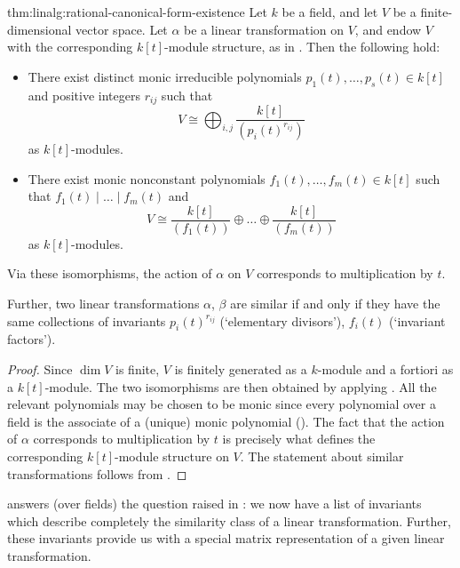 \begin{thm}{}{thm:linalg:rational-canonical-form-existence}
  Let $k$ be a field, and let $V$ be a finite-dimensional vector
  space.  Let $\alpha$ be a linear transformation on $V$, and endow
  $V$ with the corresponding $k[t]$-module structure, as in
  .  Then the following hold:
  \begin{itemize}
  \item There exist distinct monic irreducible polynomials
    $p_1(t), \dots, p_s(t) \in k[t]$ and positive integers $r_{ij}$
    such that
    \[
      V \cong \bigoplus_{i,j} \frac{k[t]}{(p_i(t)^{r_{ij}})}
    \]
    as $k[t]$-modules.
  \item There exist monic nonconstant polynomials
    $f_1(t), \dots, f_m(t) \in k[t]$ such that
    $f_1(t) \mid \dots \mid f_m(t)$ and
    \[
      V \cong \frac{k[t]}{(f_1(t))} \oplus \dots \oplus
      \frac{k[t]}{(f_m(t))}
    \]
    as $k[t]$-modules.
  \end{itemize}
  Via these isomorphisms, the action of $\alpha$ on $V$ corresponds to
  multiplication by $t$.

  Further, two linear transformations $\alpha$, $\beta$ are similar if
  and only if they have the same collections of invariants
  $p_i(t)^{r_{ij}}$ (`elementary divisors'), $f_i(t)$ (`invariant
  factors').
\end{thm}

\begin{proof}
  Since $\dim V$ is finite, $V$ is finitely generated as a $k$-module
  and a fortiori as a $k[t]$-module. The two isomorphisms are then
  obtained by applying . All the relevant polynomials
  may be chosen to be monic since every polynomial over a field is the
  associate of a (unique) monic polynomial
  (). The fact that
  the action of $\alpha$ corresponds to multiplication by $t$ is
  precisely what defines the corresponding $k[t]$-module structure on
  $V$. The statement about similar transformations follows from
  .
\end{proof}

 answers (over fields) the question raised in
: we now have a
list of invariants which describe completely the similarity class of a
linear transformation. Further, these invariants provide us with a
special matrix representation of a given linear transformation.

